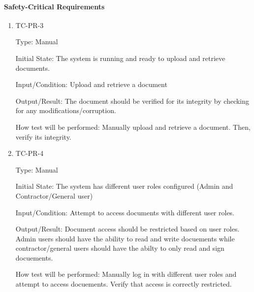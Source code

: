 \documentclass[12pt, titlepage]{article}
\begin{document}
\paragraph{Safety-Critical Requirements}
\begin{enumerate}

  \item {TC-PR-3\\}

    Type: Manual

    Initial State: The system is running and ready to upload and retrieve
    documents.

    Input/Condition: Upload and retrieve a document

    Output/Result: The document should be verified for its integrity by checking
    for any modifications/corruption.

    How test will be performed: Manually upload and retrieve a document. Then,
    verify its integrity.

  \item {TC-PR-4\\}

    Type: Manual

    Initial State: The system has different user roles configured (Admin and 
    Contractor/General user)

    Input/Condition: Attempt to access documents with different user roles.

    Output/Result: Document access should be restricted based on user roles. 
    Admin users should have the ability to read and write docuements while
    contractor/general users should have the abilty to only read and sign
    docuements.

    How test will be performed: Manually log in with different user roles and 
    attempt to access docuements. Verify that access is correctly restricted.

\end{enumerate}
\end{document}
